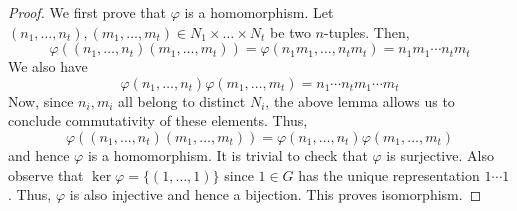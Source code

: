\begin{proof}
    We first prove that $\varphi$ is a homomorphism. Let $(n_1, \ldots, n_t), (m_1, \ldots, m_t) \in N_1 \times \ldots \times N_t$ be two $n$-tuples. Then, 
    \[
        \varphi\left( (n_1, \ldots, n_t) (m_1, \ldots, m_t) \right) = \varphi\left( n_1m_1, \ldots, n_tm_t \right) = n_1m_1 \cdots n_tm_t
    \]
    We also have
    \[
        \varphi(n_1, \ldots, n_t) \varphi(m_1, \ldots, m_t) = n_1\cdots n_t m_1 \cdots m_t
    \]
    Now, since $n_i, m_i$ all belong to distinct $N_i$, the above lemma allows us to conclude commutativity of these elements. Thus, 
    \[
        \varphi\left( (n_1, \ldots, n_t) (m_1, \ldots, m_t) \right) = \varphi(n_1, \ldots, n_t) \varphi(m_1, \ldots, m_t)
    \]
    and hence $\varphi$ is a homomorphism. It is trivial to check that $\varphi$ is surjective. Also observe that $\ker\varphi = \{(1, \ldots, 1)\}$ since $1 \in G$ has the unique representation $1 \cdots 1$. Thus, $\varphi$ is also injective and hence a bijection. This proves isomorphism.
\end{proof}

